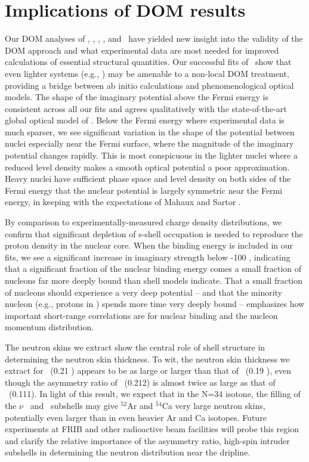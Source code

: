 \section{Implications of DOM results}
Our DOM analyses of \oSixEight, \caAughtEight, \niEightFour, \snTwelveFour,
and \pbEight\ have yielded new insight into the validity of the DOM approach
and what experimental data are most needed for improved calculations of
essential structural quantities. Our successful fits of \oSixEight\ show that
even lighter systems (e.g., \cTwelve) may be amenable to a non-local DOM
treatment, providing a bridge between ab initio calculations and
phenomenological optical models. The shape of the imaginary potential
above the Fermi energy is consistent across all our fits and agrees
qualitatively with the state-of-the-art global optical model of \cite{KoningDelaroche}. 
Below the Fermi energy where experimental data is much sparser, we see
significant variation in the shape of the potential between nuclei especially
near the Fermi surface, where the magnitude of the imaginary potential changes
rapidly. This is most conspicuous in the lighter nuclei where a reduced level density
makes a smooth optical potential a poor approximation.
Heavy nuclei have sufficient phase space and level density on both
sides of the Fermi energy that the nuclear potential is largely symmetric near
the Fermi energy, in keeping with the expectations of Mahaux and Sartor \cite{Mahaux1991}.

By comparison to experimentally-measured charge density distributions, we confirm
that significant depletion of s-shell occupation is needed to reproduce the
proton density in the nuclear core. When the binding energy is included in our fits,
we see a significant increase in imaginary strength below -100
\mega\electronvolt, indicating that a significant fraction of the nuclear
binding energy comes a small fraction of nucleons far more deeply bound than
shell models indicate. That a small fraction of nucleons should experience a
very deep potential -- and that the minority nucleon (e.g., protons in \pbEight)
spends more time very deeply bound -- emphasizes how important short-range
correlations are for nuclear binding and the nucleon momentum distribution.

The neutron skins we extract show the central role of shell structure in
determining the neutron skin thickness. To wit, the neutron skin thickness we
extract for \oEight\ (0.21 \femto\meter) appears to be as large or larger than that of
\pbEight\ (0.19 \femto\meter), even though the asymmetry ratio of \pbEight\
(0.212) is almost twice as large as that of \oEight\ (0.111). In light of this
result, we expect that in the N=34 isotone, the filling of the $\nu$ \fSeven\ and \fFive\ subshells
may give $^{52}$Ar and $^{54}$Ca very large neutron skins, potentially even
larger than in even heavier Ar and Ca isotopes. Future experiments at FRIB and other
radioactive beam facilities will probe this region and clarify the relative
importance of the asymmetry ratio, high-spin intruder subshells in determining
the neutron distribution near the dripline.

